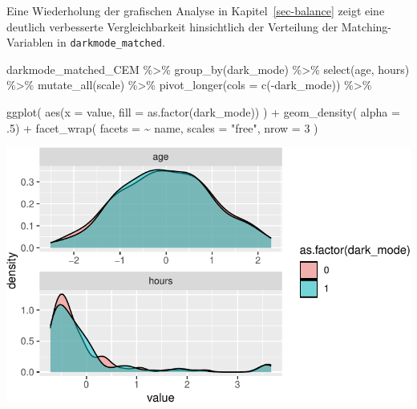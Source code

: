 \documentclass[
  a4paper,
  DIV=11,
  oneside]{scrreprt}
\newenvironment{Shaded}{\begin{snugshade}}{\end{snugshade}}
\newcommand{\AttributeTok}[1]{\textcolor[rgb]{0.40,0.45,0.13}{#1}}
\newcommand{\DecValTok}[1]{\textcolor[rgb]{0.68,0.00,0.00}{#1}}
\newcommand{\FunctionTok}[1]{\textcolor[rgb]{0.28,0.35,0.67}{#1}}
\newcommand{\NormalTok}[1]{\textcolor[rgb]{0.00,0.23,0.31}{#1}}
\newcommand{\SpecialCharTok}[1]{\textcolor[rgb]{0.37,0.37,0.37}{#1}}
\newcommand{\StringTok}[1]{\textcolor[rgb]{0.13,0.47,0.30}{#1}}
\begin{document}
Eine Wiederholung der grafischen Analyse in Kapitel~\ref{sec-balance}
zeigt eine deutlich verbesserte Vergleichbarkeit hinsichtlich der
Verteilung der Matching-Variablen in \texttt{darkmode\_matched}.

\begin{Shaded}
\begin{Highlighting}[]
\NormalTok{darkmode\_matched\_CEM }\SpecialCharTok{\%\textgreater{}\%}
  \FunctionTok{group\_by}\NormalTok{(dark\_mode) }\SpecialCharTok{\%\textgreater{}\%}
  \FunctionTok{select}\NormalTok{(age, hours) }\SpecialCharTok{\%\textgreater{}\%}
  \FunctionTok{mutate\_all}\NormalTok{(scale) }\SpecialCharTok{\%\textgreater{}\%}
  \FunctionTok{pivot\_longer}\NormalTok{(}\AttributeTok{cols =} \FunctionTok{c}\NormalTok{(}\SpecialCharTok{{-}}\NormalTok{dark\_mode)) }\SpecialCharTok{\%\textgreater{}\%}
  
  \FunctionTok{ggplot}\NormalTok{(}
    \FunctionTok{aes}\NormalTok{(}\AttributeTok{x =}\NormalTok{ value, }\AttributeTok{fill =} \FunctionTok{as.factor}\NormalTok{(dark\_mode))}
\NormalTok{  ) }\SpecialCharTok{+}
  \FunctionTok{geom\_density}\NormalTok{( }\AttributeTok{alpha =}\NormalTok{ .}\DecValTok{5}\NormalTok{) }\SpecialCharTok{+} 
  \FunctionTok{facet\_wrap}\NormalTok{(}
    \AttributeTok{facets =} \SpecialCharTok{\textasciitilde{}}\NormalTok{ name, }
    \AttributeTok{scales =} \StringTok{"free"}\NormalTok{, }
    \AttributeTok{nrow =} \DecValTok{3}
\NormalTok{  )}
\end{Highlighting}
\end{Shaded}

\includegraphics{Matching_files/figure-pdf/unnamed-chunk-39-1.pdf}
\end{document}
